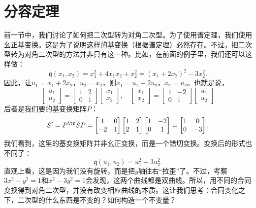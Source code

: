 \documentclass[12pt,UTF8]{ctexbook}
\begin{document}
\section{分容定理}
前一节中，我们讨论了如何把二次型转为对角二次型。为了使用谱定理，我们使用幺正基变换。这是为了说明这样的基变换（根据谱定理）必然存在。不过，把二次型转为对角二次型的方法并非只有这一种。比如，在前面的例子里，我们还可以这样做：
$$ \mathfrak{q}(x_1, x_2) = x_1^2 + 4x_1x_2 + x_2^2 = (x_1 + 2x_2)^2 - 3x_2^2. $$
因此，让$u_1 = x_1+2x_2$，$u_2 = x_2$，则$x_1 = u_1 - 2u_2$，$x_2 = u_2$。也就是说，
$$
\begin{bmatrix}
    u_1 \\ u_2
\end{bmatrix} = 
\begin{bmatrix}
    1 & 2 \\ 0 & 1
\end{bmatrix}
\begin{bmatrix}
    x_1 \\ x_2
\end{bmatrix}, \quad 
\begin{bmatrix}
    x_1 \\ x_2
\end{bmatrix} = 
\begin{bmatrix}
    1 & -2 \\ 0 & 1
\end{bmatrix}
\begin{bmatrix}
    u_1 \\ u_2
\end{bmatrix}
$$
后者是我们要的基变换矩阵$P$：
$$
S' = P^{\tr} S P =
\begin{bmatrix}
    1 & 0 \\ -2 & 1
\end{bmatrix}
\begin{bmatrix}
    1 & 2 \\ 2 & 1
\end{bmatrix}
\begin{bmatrix}
    1 & -2 \\ 0 & 1
\end{bmatrix} = 
\begin{bmatrix}
    1 & 0 \\ 0 & -3
\end{bmatrix}.
$$
我们看到，这里的基变换矩阵并非幺正变换，而是一个错切变换。变换后的形式也不同了：
$$ \mathfrak{q}(u_1, u_2) = u_1^2 -  3u_2^2. $$
直观上看，这是因为我们没有旋转，而是把$y$轴往右“拉歪”了。不过，考察$3x^2 - y^2 = 1$和$x^2 - 3y^2 = 1$会发现，这两个曲线都是双曲线。所以，用不同的合同变换得到对角二次型，并没有改变相应曲线的本质。这让我们思考：合同变化之下，二次型的什么东西是不变的？如何构造一个不变量？
\end{document}
